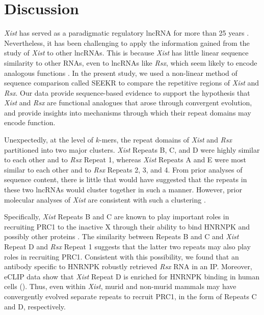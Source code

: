 \section{Discussion}
\emph{Xist} has served as a paradigmatic regulatory lncRNA for more than 25 years \cite{Brockdorff2018LocalNcRNA,Balaton2018TheChromosome,DaRocha2017NovelConformation,Sahakyan2018TheCompensation}. Nevertheless, it has been challenging to apply the information gained from the study of \emph{Xist} to other lncRNAs. This is because \emph{Xist} has little linear sequence similarity to other RNAs, even to lncRNAs like \emph{Rsx}, which seem likely to encode analogous functions \cite{Grant2012RsxInactivation,Wang2014Chromosome-wideDomestica}. In the present study, we used a non-linear method of sequence comparison called SEEKR \cite{Kirk2018FunctionalContent} to compare the repetitive regions of \emph{Xist} and \emph{Rsx}. Our data provide sequence-based evidence to support the hypothesis that \emph{Xist} and \emph{Rsx} are functional analogues that arose through convergent evolution, and provide insights into mechanisms through which their repeat domains may encode function. 

Unexpectedly, at the level of $k$-mers, the repeat domains of \emph{Xist} and \emph{Rsx} partitioned into two major clusters. \emph{Xist} Repeats B, C, and D were highly similar to each other and to \emph{Rsx} Repeat 1, whereas \emph{Xist} Repeats A and E were most similar to each other and to \emph{Rsx} Repeats 2, 3, and 4. From prior analyses of sequence content, there is little that would have suggested that the repeats in these two lncRNAs would cluster together in such a manner. However, prior molecular analyses of \emph{Xist} are consistent with such a clustering \cite{Brockdorff2018LocalNcRNA,Balaton2018TheChromosome,DaRocha2017NovelConformation,Sahakyan2018TheCompensation}. 

Specifically, \emph{Xist} Repeats B and C are known to play important roles in recruiting PRC1 to the inactive X through their ability to bind HNRNPK and possibly other proteins \cite{Pintacuda2017HnRNPKSilencing}. The similarity between Repeats B and C and \emph{Xist} Repeat D and \emph{Rsx} Repeat 1 suggests that the latter two repeats may also play roles in recruiting PRC1. Consistent with this possibility, we found that an antibody specific to HNRNPK robustly retrieved \emph{Rsx} RNA in an IP. Moreover, eCLIP data show that \emph{Xist} Repeat D is enriched for HNRNPK binding in human cells (\cite{VanNostrand2016RobusteCLIP}). Thus, even within \emph{Xist}, murid and non-murid mammals may have convergently evolved separate repeats to recruit PRC1, in the form of Repeats C and D, respectively.

